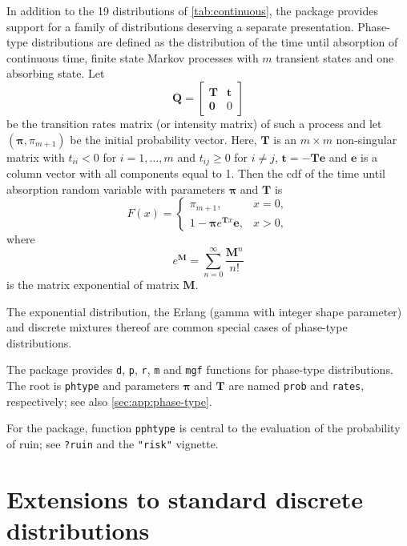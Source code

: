 \documentclass[x11names]{article}
\newcommand{\mat}[1]{\bm{#1}}
\newcommand{\code}[1]{\texttt{#1}}
\begin{document}
In addition to the 19 distributions of \autoref{tab:continuous},
the package provides support for a family of distributions deserving a
separate presentation. Phase-type distributions \citep{Neuts_81} are
defined as the distribution of the time until absorption of continuous
time, finite state Markov processes with $m$ transient states and one
absorbing state. Let
\begin{equation}
  \label{eq:Markov-transition-matrix}
  \mat{Q} =
  \begin{bmatrix}
    \mat{T} & \mat{t} \\
    \mat{0} & 0
  \end{bmatrix}
\end{equation}
be the transition rates matrix (or intensity matrix) of such a process
and let $(\mat{\pi}, \pi_{m + 1})$ be the initial probability vector.
Here, $\mat{T}$ is an $m \times m$ non-singular matrix with $t_{ii} <
0$ for $i = 1, \dots, m$ and $t_{ij} \geq 0$ for $i \neq j$, $\mat{t}
= - \mat{T} \mat{e}$ and $\mat{e}$ is a column vector with all
components equal to 1. Then the cdf of the time until absorption
random variable with parameters $\mat{\pi}$ and $\mat{T}$ is
\begin{equation}
  \label{eq:cdf-phtype}
  F(x) =
  \begin{cases}
    \pi_{m + 1}, & x = 0, \\
    1 - \mat{\pi} e^{\mat{T} x} \mat{e}, & x > 0,
  \end{cases}
\end{equation}
where
\begin{equation}
  \label{eq:matrix-exponential}
  e^{\mat{M}} = \sum_{n = 0}^\infty \frac{\mat{M}^n}{n!}
\end{equation}
is the matrix exponential of matrix $\mat{M}$.

The exponential distribution, the Erlang (gamma with integer shape
parameter) and discrete mixtures thereof are common special cases of
phase-type distributions.

The package provides \code{d}, \code{p}, \code{r}, \code{m} and
\code{mgf} functions for phase-type distributions. The root is
\code{phtype} and parameters $\mat{\pi}$ and $\mat{T}$ are named
\code{prob} and \code{rates}, respectively; see also
\autoref{sec:app:phase-type}.

For the package, function \code{pphtype} is central to the evaluation
of the probability of ruin; see \code{?ruin} and the \code{"risk"}
vignette.


\section{Extensions to standard discrete distributions}
\label{sec:discrete}
\end{document}
